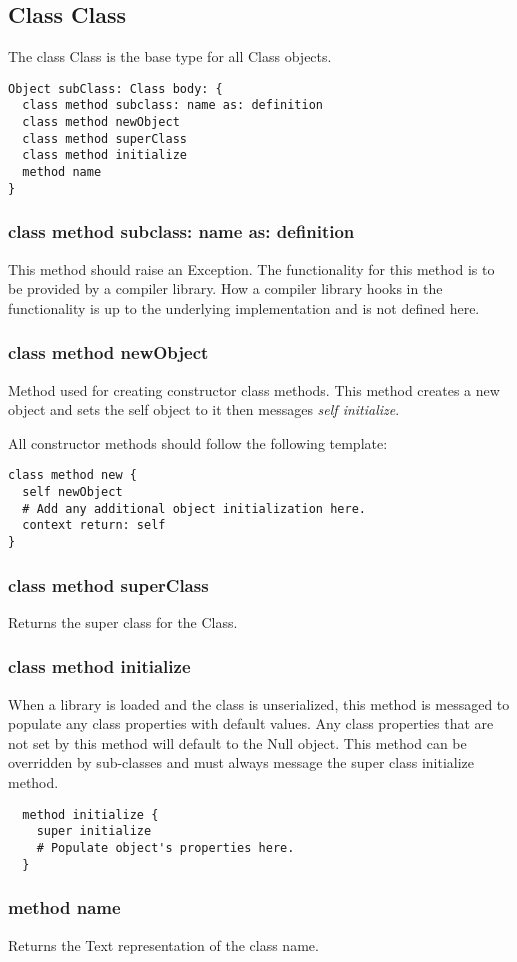 \newpage
\subsection{Class Class}

The class Class is the base type for all Class objects.

\begin{lstlisting}
Object subClass: Class body: {
  class method subclass: name as: definition
  class method newObject
  class method superClass
  class method initialize
  method name
}
\end{lstlisting}

\subsubsection{class method subclass: name as: definition}
This method should raise an Exception. The functionality for this method is to be provided by a compiler library. How a compiler library hooks in the functionality is up to the underlying implementation and is not defined here.

\subsubsection{class method newObject}
\label{sec:class_method_newobject}
Method used for creating constructor class methods. This method creates a new object and sets the self object to it then messages \textit{self initialize}.

All constructor methods should follow the following template:

\begin{lstlisting}
class method new {
  self newObject
  # Add any additional object initialization here.
  context return: self
}
\end{lstlisting}

\subsubsection{class method superClass}
Returns the super class for the Class.

\subsubsection{class method initialize}
When a library is loaded and the class is unserialized, this method is messaged to populate any class properties with default values. Any class properties that are not set by this method will default to the Null object. This method can be overridden by sub-classes and must always message the super class initialize method.

\begin{lstlisting}
  method initialize {
    super initialize
    # Populate object's properties here.
  }
\end{lstlisting}

\subsubsection{method name}
Returns the Text representation of the class name.
